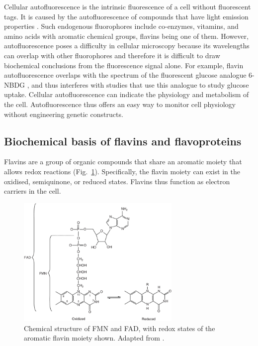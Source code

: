 Cellular autofluorescence is the intrinsic fluorescence of a cell without fluorescent tags.
It is caused by the autofluorescence of compounds that have light emission properties \parencite{maslankaAutofluorescenceYeastSaccharomyces2018}.
Such endogenous fluorophores include co-enzymes, vitamins, and amino acids with aromatic chemical groups, flavins being one of them.
However, autofluorescence poses a difficulty in cellular microscopy because its wavelengths can overlap with other fluorophores and therefore it is difficult to draw biochemical conclusions from the fluorescence signal alone.
For example, flavin autofluorescence overlaps with the spectrum of the fluorescent glucose analogue 6-NBDG \parencite{maslankaAutofluorescenceYeastSaccharomyces2018}, and thus interferes with studies that use this analogue to study glucose uptake.
Cellular autofluorescence can indicate the physiology and metabolism of the cell.
Autofluorescence thus offers an easy way to monitor cell physiology without engineering genetic constructs.

\subsection{Biochemical basis of flavins and flavoproteins}
\label{subsec:intro-flavin-biochem}

Flavins are a group of organic compounds that share an aromatic moiety that allows redox reactions (Fig.\ \ref{fig:intro-flavin-structure}).
Specifically, the flavin moiety can exist in the oxidised, semiquinone, or reduced states.
Flavins thus function as electron carriers in the cell.

\begin{figure}[h!]
  \centering
  \includegraphics[width=0.7\textwidth]{patelFlavinContainingOxidativeBiocatalysts2006_1}
  \caption[
    Chemical structure of FMN and FAD
  ]{
    Chemical structure of FMN and FAD, with redox states of the aromatic flavin moiety shown.
    Adapted from \textcite{patelFlavinContainingOxidativeBiocatalysts2006}.}
  \label{fig:intro-flavin-structure}
\end{figure}

